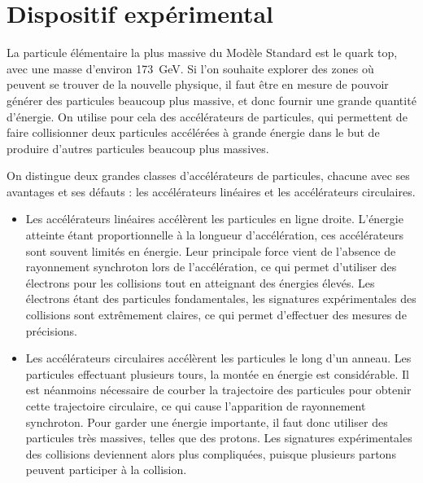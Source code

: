 \chapter{Dispositif expérimental} \label{chap:detecteur}


La particule élémentaire la plus massive du Modèle Standard est le quark top, avec une masse d'environ \SI{173}{\GeV}. Si l'on souhaite explorer des zones où peuvent se trouver de la nouvelle physique, il faut être en mesure de pouvoir générer des particules beaucoup plus massive, et donc fournir une grande quantité d'énergie. On utilise pour cela des accélérateurs de particules, qui permettent de faire collisionner deux particules accélérées à grande énergie dans le but de produire d'autres particules beaucoup plus massives.

On distingue deux grandes classes d'accélérateurs de particules, chacune avec ses avantages et ses défauts : les accélérateurs linéaires et les accélérateurs circulaires.

\begin{itemize}
  \item Les accélérateurs linéaires accélèrent les particules en ligne droite. L'énergie atteinte étant proportionnelle à la longueur d'accélération, ces accélérateurs sont souvent limités en énergie. Leur principale force vient de l'absence de rayonnement synchroton lors de l'accélération, ce qui permet d'utiliser des électrons pour les collisions tout en atteignant des énergies élevés. Les électrons étant des particules fondamentales, les signatures expérimentales des collisions sont extrêmement claires, ce qui permet d'effectuer des mesures de précisions.
  \item Les accélérateurs circulaires accélèrent les particules le long d'un anneau. Les particules effectuant plusieurs tours, la montée en énergie est considérable. Il est néanmoins nécessaire de courber la trajectoire des particules pour obtenir cette trajectoire circulaire, ce qui cause l'apparition de rayonnement synchroton. Pour garder une énergie importante, il faut donc utiliser des particules très massives, telles que des protons. Les signatures expérimentales des collisions deviennent alors plus compliquées, puisque plusieurs partons peuvent participer à la collision.
\end{itemize}


